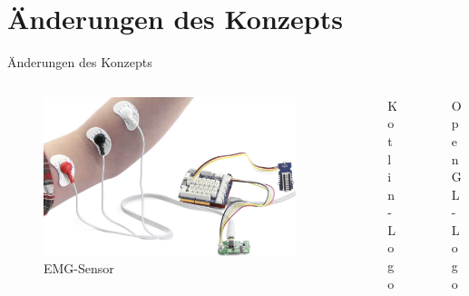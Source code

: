 \documentclass[hyphens]{beamer}
\begin{document}
 \section{Änderungen des Konzepts}
 \begin{frame}{Änderungen des Konzepts}
 \begin{columns}[T]
 \begin{column}{0.33\textwidth}
 \begin{figure}
 \includegraphics[scale=0.08]{img/grove-emg.png}
\caption{EMG-Sensor}
 \end{figure}
 \end{column}
 \pause
 \begin{column}{0.33\textwidth}
 \begin{figure}
 \hspace{6pt}
 
 \caption{Kotlin-Logo}
 \end{figure}
 \end{column}
 \pause
 \begin{column}{0.34\textwidth}
 \begin{figure}
 \vspace{10pt}
 
 \caption{OpenGL-Logo}
 \end{figure}
 \end{column}
 \end{columns}
 \end{frame}
\end{document}
